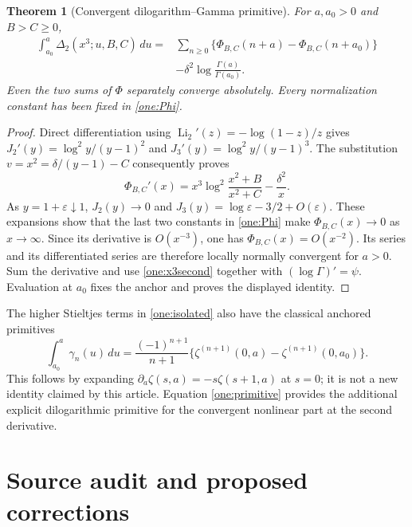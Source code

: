 \documentclass[11pt,a4paper]{article}
\numberwithin{equation}{section}
\theoremstyle{plain}
\newtheorem{theorem}{Theorem}[section]
\theoremstyle{definition}
\theoremstyle{remark}
\DeclareMathOperator{\Li}{Li}
\begin{document}
\begin{theorem}[Convergent dilogarithm--Gamma primitive]
\label{thm:primitive}
For $a,a_0>0$ and $B>C\ge0$,
\begin{equation}\label{one:primitive}
 \boxed{\begin{aligned}
 \int_{a_0}^{a}\Delta_2(x^3;u,B,C)\,du
 ={}&\sum_{n\ge0}\{\Phi_{B,C}(n+a)-\Phi_{B,C}(n+a_0)\}\\
 &-\delta^2\log\frac{\Gamma(a)}{\Gamma(a_0)}.
 \end{aligned}}
\end{equation}
Even the two sums of $\Phi$ separately converge absolutely.  Every
normalization constant has been fixed in \eqref{one:Phi}.
\end{theorem}
\begin{proof}
Direct differentiation using
$\Li_2'(z)=-\log(1-z)/z$ gives
$J_2'(y)=\log^2y/(y-1)^2$ and
$J_3'(y)=\log^2y/(y-1)^3$.
The substitution $v=x^2=\delta/(y-1)-C$ consequently proves
\[
 \Phi_{B,C}'(x)=x^3\log^2\frac{x^2+B}{x^2+C}-\frac{\delta^2}{x}.
\]
As $y=1+\varepsilon\downarrow1$, $J_2(y)\to0$ and
$J_3(y)=\log\varepsilon-3/2+O(\varepsilon)$.
These expansions show that the last two constants in
\eqref{one:Phi} make $\Phi_{B,C}(x)\to0$ as $x\to\infty$.
Since its derivative is $O(x^{-3})$, one has
$\Phi_{B,C}(x)=O(x^{-2})$.  Its series and its differentiated
series are therefore locally normally convergent for $a>0$.
Sum the derivative and use \eqref{one:x3second} together with
$(\log\Gamma)'=\psi$.  Evaluation at $a_0$ fixes the anchor and
proves the displayed identity.
\end{proof}

The higher Stieltjes terms in \eqref{one:isolated} also have the
classical anchored primitives
\begin{equation}\label{one:Stieltjesprimitive}
 \int_{a_0}^a\gamma_n(u)\,du
   =\frac{(-1)^{n+1}}{n+1}
       \{\zeta^{(n+1)}(0,a)-\zeta^{(n+1)}(0,a_0)\}.
\end{equation}
This follows by expanding
$\partial_a\zeta(s,a)=-s\zeta(s+1,a)$ at $s=0$; it is not a
new identity claimed by this article.  Equation \eqref{one:primitive}
provides the additional explicit dilogarithmic primitive for the
convergent nonlinear part at the second derivative.



\section{Source audit and proposed corrections}
\label{sec:audit}
\end{document}
